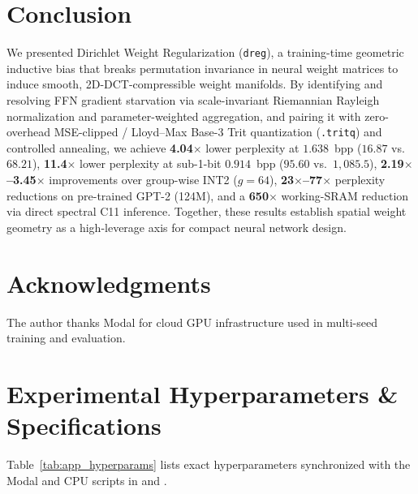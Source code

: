 \documentclass[11pt,a4paper]{article}
\begin{document}
\section{Conclusion}
\label{sec:conclusion}
We presented Dirichlet Weight Regularization (\texttt{dreg}), a training-time geometric inductive bias that breaks permutation invariance in neural weight matrices to induce smooth, 2D-DCT-compressible weight manifolds. By identifying and resolving FFN gradient starvation via scale-invariant Riemannian Rayleigh normalization and parameter-weighted aggregation, and pairing it with zero-overhead MSE-clipped / Lloyd--Max Base-3 Trit quantization (\texttt{.tritq}) and controlled annealing, we achieve \textbf{4.04$\times$} lower perplexity at $1.638$~bpp ($16.87$ vs.\ $68.21$), \textbf{11.4$\times$} lower perplexity at sub-1-bit $0.914$~bpp ($95.60$ vs.\ $1{,}085.5$), \textbf{2.19$\times$--3.45$\times$} improvements over group-wise INT2 ($g=64$), \textbf{23$\times$--77$\times$} perplexity reductions on pre-trained GPT-2 (124M), and a \textbf{650$\times$} working-SRAM reduction via direct spectral C11 inference. Together, these results establish spatial weight geometry as a high-leverage axis for compact neural network design.

\section*{Acknowledgments}
The author thanks Modal for cloud GPU infrastructure used in multi-seed training and evaluation.

\newpage



\newpage
\appendix
\section{Experimental Hyperparameters \& Specifications}
\label{sec:appendix_hyperparams}

Table~\ref{tab:app_hyperparams} lists exact hyperparameters synchronized with the Modal and CPU scripts in  and .
\end{document}
